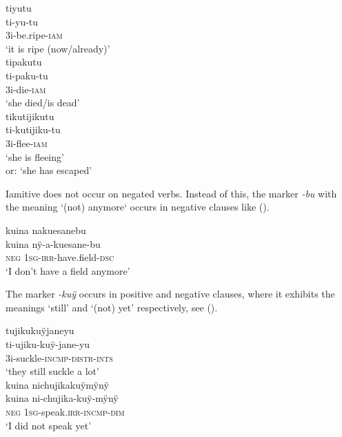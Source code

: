 \newpage
\ea\label{ex:Sketch-IAM}
  \ea
\begingl
\glpreamble tiyutu\\
\gla ti-yu-tu\\
\glb 3i-be.ripe-\textsc{iam}\\
\glft ‘it is ripe (now/already)’\\
\endgl
  \ex
\begingl
\glpreamble tipakutu\\
\gla ti-paku-tu\\
\glb 3i-die-\textsc{iam}\\
\glft ‘she died/is dead’\\
\endgl
  \ex
\begingl
\glpreamble tikutijikutu\\
\gla ti-kutijiku-tu\\
\glb 3i-flee-\textsc{iam}\\
\glft ‘she is fleeing’\\or: ‘she has escaped’\\
\endgl
\z
\xe

Iamitive does not occur on negated verbs. Instead of this, the  marker \textit{-bu} with the meaning ‘(not) anymore‘ occurs in negative clauses like ().

\newpage
\ea\label{ex:Sketch-DSC}
\begingl
\glpreamble kuina nakuesanebu\\
\gla kuina nÿ-a-kuesane-bu\\
\glb \textsc{neg} 1\textsc{sg}-\textsc{irr}-have.field-\textsc{dsc}\\
\glft ‘I don’t have a field anymore’\\
\endgl
\xe

The  marker \textit{-kuÿ} occurs in positive and negative clauses, where it exhibits the meanings ‘still’ and ‘(not) yet’ respectively, see ().

\ea\label{ex:Sketch-INCMP}
  \ea
\begingl
\glpreamble tujikukuÿjaneyu\\
\gla ti-ujiku-kuÿ-jane-yu\\
\glb 3i-suckle-\textsc{incmp}-\textsc{distr}-\textsc{ints}\\
\glft ‘they still suckle a lot’\\
\endgl
  \ex
\begingl
\glpreamble kuina nichujikakuÿmÿnÿ\\
\gla kuina ni-chujika-kuÿ-mÿnÿ\\
\glb \textsc{neg} 1\textsc{sg}-speak.\textsc{irr}-\textsc{incmp}-\textsc{dim}\\
\glft ‘I did not speak yet’\\
\endgl
\z
\xe 

